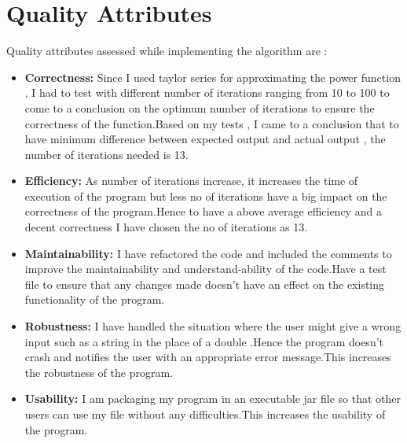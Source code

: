 \documentclass[letterpaper, 11pt]{report}
\begin{document}
\section*{Quality Attributes}
Quality attributes assessed while implementing the algorithm  are :\\
\begin{itemize}
  \item \textbf{Correctness:} Since I used taylor series for approximating the power function , I had to test with different number of iterations ranging from 10 to 100 to come to a conclusion on the optimum number of iterations to ensure the correctness of the function.Based on my tests , I came to a conclusion that to have minimum difference between expected output and actual output , the number of iterations needed is 13.
  \item \textbf{Efficiency:} As number of iterations increase, it increases the time of execution of the program but less no of iterations have a big impact on the correctness of the program.Hence to have a above average efficiency and a decent correctness I have chosen the no of iterations as 13.
  \item \textbf{Maintainability:} I have refactored the code and included the comments to improve the maintainability and understand-ability of the code.Have a test file to ensure that any changes made doesn't have an effect on the existing functionality of the program.
  \item \textbf{Robustness:} I have handled the situation where the user might give a wrong input such as a string in the place of a double .Hence the program doesn't crash and notifies the user with an appropriate error message.This increases the robustness of the program.
  \item \textbf{Usability:} I am packaging my program in an executable jar file so that other users can use my file without any difficulties.This increases the usability of the program.
\end{itemize}
\vspace{0.4cm}
\end{document}
